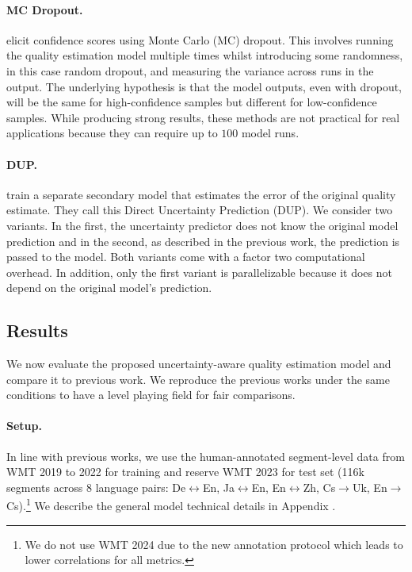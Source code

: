 \paragraph{MC Dropout.}
\citet{glushkova-etal-2021-uncertainty-aware} elicit 
confidence scores
using Monte Carlo (MC) dropout.
This involves running the quality estimation model multiple times whilst introducing some randomness, in this case random dropout, and measuring the variance across runs in the output.
The underlying hypothesis is that the model outputs, even with dropout, will be the same for high-confidence samples but different for low-confidence samples.
While producing strong results, these methods are not practical for real applications because they can require up to $100$ model runs.

\paragraph{DUP.}
\citet{zerva-etal-2022-disentangling} train a separate secondary model that estimates the error of the original quality estimate. They call this Direct Uncertainty Prediction (DUP).
We consider two variants.
In the first, the uncertainty predictor does not know the original model prediction and in the second, as described in the previous work, the prediction is passed to the model.
Both variants come with a factor two computational overhead.
In addition, only the first variant is parallelizable because it does not depend on the original model's prediction.

\subsection{Results}
\label{sec:goal_instant_confidence_results}

We now evaluate the proposed uncertainty-aware quality estimation model and compare it to previous work.
We reproduce the previous works under the same conditions to have a level playing field for fair comparisons.

\paragraph{Setup.}
In line with previous works, we use the human-annotated segment-level data from WMT 2019 to 2022 for training \citep{barrault-etal-2019-findings,barrault-etal-2020-findings,akhbardeh-etal-2021-findings-FIXED,kocmi-etal-2022-findings} and reserve WMT 2023 \citep{kocmi-etal-2023-findings} for test set (116k segments across 8 language pairs: De$\leftrightarrow$En, Ja$\leftrightarrow$En, En$\leftrightarrow$Zh, Cs$\rightarrow$Uk, En$\rightarrow$Cs).\footnote{We do not use WMT 2024 \citep{kocmi-etal-2024-findings} due to the new annotation protocol which leads to lower correlations for all metrics.
}
We describe the general model technical details in Appendix .


